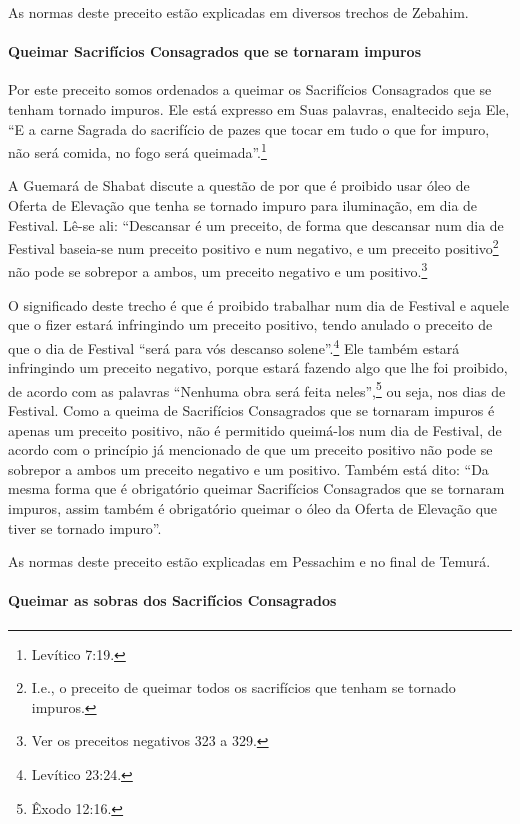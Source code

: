 As normas deste preceito estão explicadas em diversos trechos de Zebahim.

\paragraph{Queimar Sacrifícios Consagrados que se tornaram impuros}

Por este preceito somos ordenados a queimar os Sacrifícios Consagrados
que se tenham tornado impuros. Ele está expresso em Suas palavras,
enaltecido seja Ele, ``E a carne Sagrada do sacrifício de pazes que
tocar em tudo o que for impuro, não será comida, no fogo será queimada''.\footnote{Levítico 7:19.}

A Guemará de Shabat discute a questão de por que é proibido usar óleo de
Oferta de Elevação que tenha se tornado impuro para iluminação, em dia
de Festival. Lê-se ali: ``Descansar é um preceito, de forma que
descansar num dia de Festival baseia-se num preceito positivo e num negativo, e um
preceito positivo\footnote{I.e., o preceito de queimar todos os sacrifícios que tenham se tornado impuros.} não pode se sobrepor a ambos, um
preceito negativo e um positivo.\footnote{Ver os preceitos negativos 323 a 329.}

O significado deste trecho é que é proibido trabalhar num dia de
Festival e aquele que o fizer estará infringindo um preceito positivo,
tendo anulado o preceito de que o dia de Festival ``será para vós
descanso solene''.\footnote{Levítico 23:24.} Ele também estará infringindo um
preceito negativo, porque estará fazendo algo que lhe foi proibido, de
acordo com as palavras ``Nenhuma obra será feita neles'',\footnote{Êxodo 12:16.}
ou seja, nos dias de Festival. Como a queima de Sacrifícios Consagrados
que se tornaram impuros é apenas um preceito positivo, não é permitido
queimá-los num dia de Festival, de acordo com o princípio já mencionado
de que um preceito positivo não pode se sobrepor a ambos um preceito
negativo e um positivo. Também está dito: ``Da mesma forma que é
obrigatório queimar Sacrifícios Consagrados que se tornaram impuros,
assim também é obrigatório queimar o óleo da Oferta de Elevação que
tiver se tornado impuro''.

As normas deste preceito estão explicadas em Pessachim e no final de Temurá.

\paragraph{Queimar as sobras dos Sacrifícios Consagrados}

